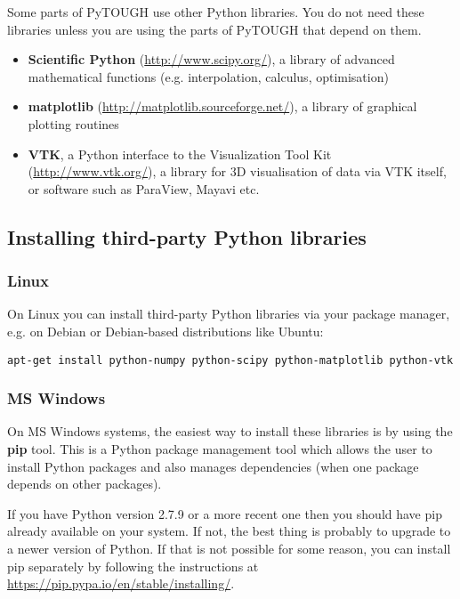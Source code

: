 
Some parts of PyTOUGH use other Python libraries.  You do not need these libraries unless you are using the parts of PyTOUGH that depend on them.

\begin{itemize}
\item \textbf{Scientific Python} (\url{http://www.scipy.org/}), a library of advanced mathematical functions (e.g. interpolation, calculus, optimisation)
\item \textbf{matplotlib} (\url{http://matplotlib.sourceforge.net/}), a library of graphical plotting routines
\item \textbf{VTK}, a Python interface to the Visualization Tool Kit (\url{http://www.vtk.org/}), a library for 3D visualisation of data via VTK itself, or software such as ParaView, Mayavi etc.
\end{itemize}

\subsection{Installing third-party Python libraries}

\subsubsection{Linux}

On Linux you can install third-party Python libraries via your package manager, e.g. on Debian or Debian-based distributions like Ubuntu:

\texttt{apt-get install python-numpy python-scipy python-matplotlib python-vtk}

\subsubsection{MS Windows}

On MS Windows systems, the easiest way to install these libraries is by using the \textbf{pip} tool. This is a Python package management tool which allows the user to install Python packages and also manages dependencies (when one package depends on other packages).

If you have Python version 2.7.9 or a more recent one then you should have pip already available on your system. If not, the best thing is probably to upgrade to a newer version of Python. If that is not possible for some reason, you can install pip separately by following the instructions at \url{https://pip.pypa.io/en/stable/installing/}.

